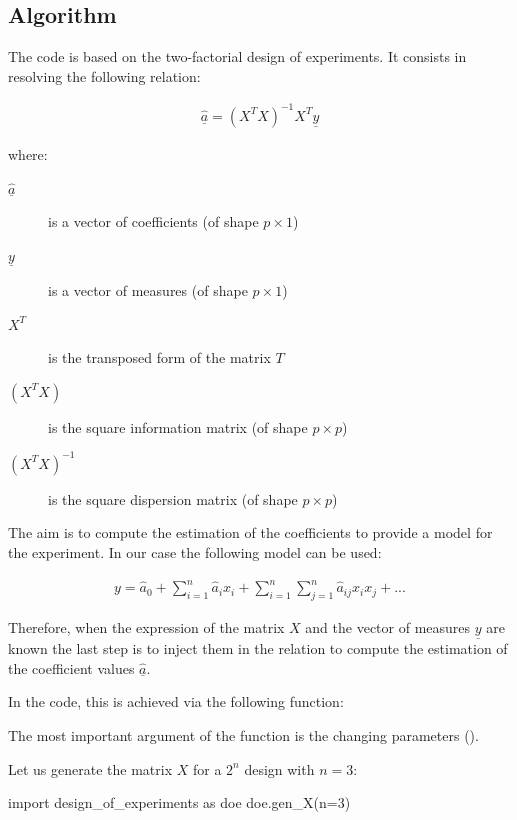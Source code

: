 \documentclass[english, 12 pt, openany, oneside]{book}
\begin{document}
\subsection{Algorithm}
The code is based on the two-factorial design of experiments. It consists in resolving the following relation:

\begin{align*}
\hat{\underline{a}} = \left(X^T X\right)^{-1} X^T \underline{y}
\end{align*}

\noindent where: 

\begin{description}
\item[$\hat{\underline{a}}$] is a vector of coefficients (of shape $p\times 1$)
\item[$\underline{y}$] is a vector of measures (of shape $p\times 1$)
\item[$X^T$] is the transposed form of the matrix $T$
\item[$\left(X^T X\right)$] is the square information matrix (of shape $p\times p$)
\item[$\left(X^T X\right)^{-1}$] is the square dispersion matrix (of shape $p\times p$)
\end{description}

The aim is to compute the estimation of the coefficients to provide a model for the experiment. In our case the following model can be used:

\begin{align*}
y = \hat{a}_0 + \sum^n_{i=1} \hat{a}_i x_i + \sum^n_{i=1} \sum^n_{j=1} \hat{a}_{ij} x_i {x}_j + ...
\end{align*}

Therefore, when the expression of the matrix ${X}$ and the vector of measures $\underline{y}$ are known the last step is to inject them in the relation to compute the estimation of the coefficient values $\hat{\underline{a}}$. 

In the code, this is achieved via the following function:\\ 

The most important argument of the function is the changing parameters ().

Let us generate the matrix $X$ for a $2^n$ design with $n=3$:

\begin{pyconsole}[][breaklines]
import design_of_experiments as doe
doe.gen_X(n=3)
\end{pyconsole}
\end{document}
